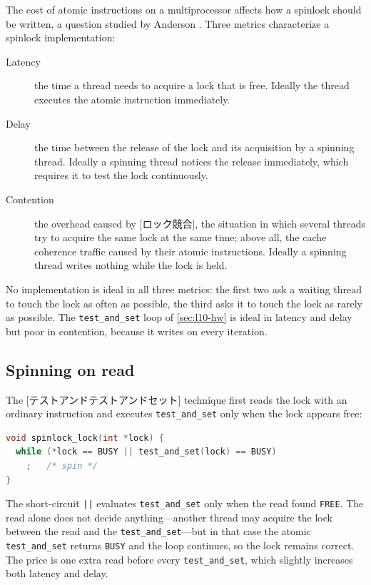 \documentclass[../main.tex]{subfiles}
\begin{document}
The cost of atomic instructions on a multiprocessor affects how a spinlock
should be written, a question studied by
Anderson \cite{anderson1990}.  Three
metrics characterize a spinlock implementation:
\begin{description}
  \item[Latency] the time a thread needs to acquire a lock that is free.
    Ideally the thread executes the atomic instruction immediately.
  \item[Delay] the time between the release of the lock and its
    acquisition by a spinning thread.  Ideally a spinning thread notices
    the release immediately, which requires it to test the lock
    continuously.
  \item[Contention] the overhead caused by
    [ロック競合], the situation in which several
    threads try to acquire the same lock at the same time; above all, the
    cache coherence traffic caused by their atomic instructions.  Ideally a
    spinning thread writes nothing while the lock is held.
\end{description}
No implementation is ideal in all three metrics: the first two ask a
waiting thread to touch the lock as often as possible, the third asks it to
touch the lock as rarely as possible.  The \texttt{test\_and\_set} loop of
\cref{sec:l10-hw} is ideal in latency and delay but poor in contention,
because it writes on every iteration.

\subsection{Spinning on read}

The [テストアンドテストアンドセット] technique
first reads the lock with an ordinary instruction and executes
\texttt{test\_and\_set} only when the lock appears free:
\begin{lstlisting}[language=C, numbers=none]
void spinlock_lock(int *lock) {
  while (*lock == BUSY || test_and_set(lock) == BUSY)
    ;   /* spin */
}
\end{lstlisting}
The short-circuit \texttt{||} evaluates \texttt{test\_and\_set} only when
the read found \texttt{FREE}.  The read alone does not decide
anything---another thread may acquire the lock between the read and the
\texttt{test\_and\_set}---but in that case the atomic
\texttt{test\_and\_set} returns \texttt{BUSY} and the loop continues, so
the lock remains correct.  The price is one extra read before every
\texttt{test\_and\_set}, which slightly increases both latency and delay.
\end{document}

